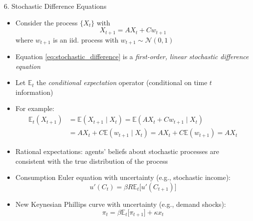 \documentclass[10pt]{beamer}
\begin{document}
\begin{frame}{6. Stochastic Difference Equations}
\begin{itemize}
\item Consider the process $\{X_t\}$ with 
\begin{equation}\label{eq:stochastic_difference}
	X_{t+1} = A X_t + Cw_{t+1}
\end{equation}
where $w_{t+1}$ is an iid. process with $w_{t+1} \sim \mathcal N(0, 1)$

\item Equation \eqref{eq:stochastic_difference} is a \textit{first-order, linear stochastic difference equation}

\item Let $\mathbb E_t$ the \textit{conditional expectation} operator (conditional on time $t$ information)

\item For example:
\begin{align*}
	\mathbb E_t(X_{t+1}) &= \mathbb E(X_{t+1} \mid X_t) = \mathbb E(A X_t + Cw_{t+1} \mid X_t) \\
	&= A X_t + C \mathbb E(w_{t+1} \mid X_t) = A X_t + C \mathbb E(w_{t+1}) = A X_t
\end{align*}
\end{itemize}
\end{frame}


\begin{frame}{}
\begin{itemize}
\item Rational expectations: agents' beliefs about stochastic processes are consistent with the true distribution of the process

\item Consumption Euler equation with uncertainty (e.g., stochastic income):
\begin{equation*}
	u'(C_t) = \beta R \mathbb E_t \Big[ u'(C_{t+1}) \Big]
\end{equation*}

\item New Keynesian Phillips curve with uncertainty (e.g., demand shocks):
\begin{equation*}
	\pi_t = \beta \mathbb E_t \Big[ \pi_{t+1} \Big] + \kappa x_t
\end{equation*}
\end{itemize}
\end{frame}











\appendix
\end{document}
